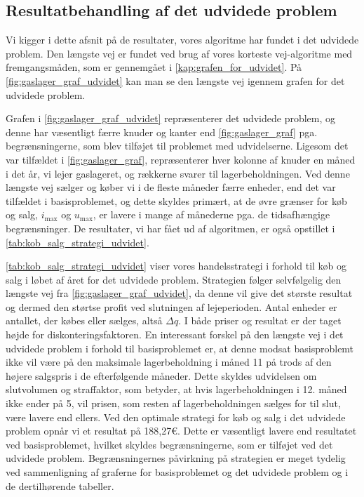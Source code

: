 \subsection{Resultatbehandling af det udvidede problem} \label{kap:resultat_udvidet}

Vi kigger i dette afsnit på de resultater, vores algoritme har fundet i det udvidede problem. Den længste vej er fundet ved brug af vores korteste vej-algoritme med fremgangsmåden, som er gennemgået i \autoref{kap:grafen_for_udvidet}. På \autoref{fig:gaslager_graf_udvidet} kan man se den længste vej igennem grafen for det udvidede problem.

Grafen i \autoref{fig:gaslager_graf_udvidet} repræsenterer det udvidede problem, og denne har væsentligt færre knuder og kanter end \autoref{fig:gaslager_graf} pga. begrænsningerne, som blev tilføjet til problemet med udvidelserne. Ligesom det var tilfældet i \autoref{fig:gaslager_graf}, repræsenterer hver kolonne af knuder en måned i det år, vi lejer gaslageret, og rækkerne svarer til lagerbeholdningen. Ved denne længste vej sælger og køber vi i de fleste måneder færre enheder, end det var tilfældet i basisproblemet, og dette skyldes primært, at de øvre grænser for køb og salg, $i_{\max}$ og $u_{\max}$, er lavere i mange af månederne pga. de tidsafhængige begrænsninger. De resultater, vi har fået ud af algoritmen, er også opstillet i \autoref{tab:kob_salg_strategi_udvidet}. 

\autoref{tab:kob_salg_strategi_udvidet} viser vores handelsstrategi i forhold til køb og salg i løbet af året for det udvidede problem. Strategien følger selvfølgelig den længste vej fra \autoref{fig:gaslager_graf_udvidet}, da denne vil give det største resultat og dermed den størtse profit ved slutningen af lejeperioden. Antal enheder er antallet, der købes eller sælges, altså $\Delta q$. I både priser og resultat er der taget højde for diskonteringsfaktoren. En interessant forskel på den længste vej i det udvidede problem i forhold til basisproblemet er, at denne modsat basisproblemt ikke vil være på den maksimale lagerbeholdning i måned 11 på trods af den højere salgspris i de efterfølgende måneder. Dette skyldes udvidelsen om slutvolumen og straffaktor, som betyder, at hvis lagerbeholdningen i 12. måned ikke ender på 5, vil prisen, som resten af lagerbeholdningen sælges for til slut, være lavere end ellers. 
Ved den optimale strategi for køb og salg i det udvidede problem opnår vi et resultat på 188,27€. Dette er væsentligt lavere end resultatet ved basisproblemet, hvilket skyldes begrænsningerne, som er tilføjet ved det udvidede problem. Begrænsningernes påvirkning på strategien er meget tydelig ved sammenligning af graferne for basisproblemet og det udvidede problem og i de dertilhørende tabeller. 
